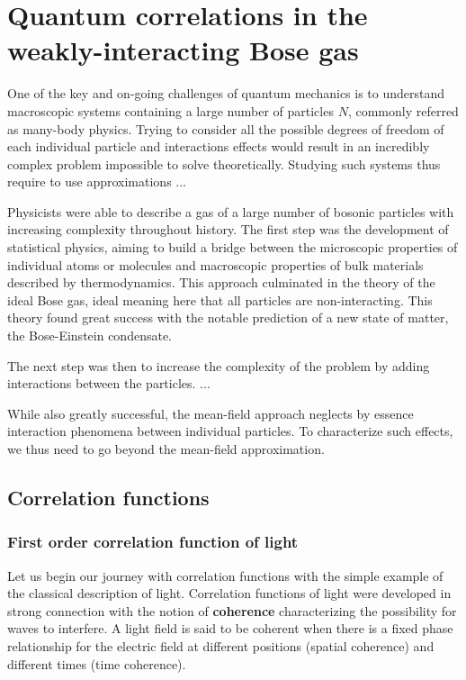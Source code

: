 \chapter{Quantum correlations in the weakly-interacting Bose gas}


One of the key and on-going challenges of quantum mechanics is to understand macroscopic systems containing a large number of particles $N$, commonly referred as many-body physics. Trying to consider all the possible degrees of freedom of each individual particle and interactions effects would result in an incredibly complex problem impossible to solve theoretically. Studying such systems thus require to use approximations ...

Physicists were able to describe a gas of a large number of bosonic particles with increasing complexity throughout history. The first step was the development of statistical physics, aiming to build a bridge between the microscopic properties of individual atoms or molecules and macroscopic properties of bulk materials described by thermodynamics. This approach culminated in the theory of the ideal Bose gas, ideal meaning here that all particles are non-interacting. This theory found great success with the notable prediction of a new state of matter, the Bose-Einstein condensate. 

The next step was then to increase the complexity of the problem by adding interactions between the particles. ...

While also greatly successful, the mean-field approach neglects by essence interaction phenomena between individual particles. To characterize such effects, we thus need to go beyond the mean-field approximation. 




\section{Correlation functions}

\subsection{First order correlation function of light}

Let us begin our journey with correlation functions with the simple example of the classical description of light. Correlation functions of light were developed in strong connection with the notion of \textbf{coherence} characterizing the possibility for waves to interfere. A light field is said to be coherent when there is a fixed phase relationship for the electric field at different positions (spatial coherence) and different times (time coherence). 


